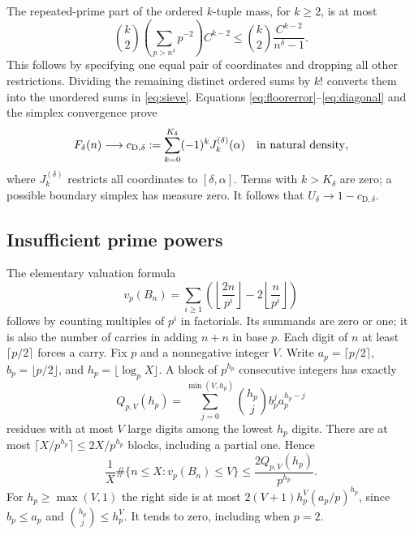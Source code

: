 \documentclass[10pt]{article}
\theoremstyle{remark}
\begin{document}
The repeated-prime part of the ordered $k$-tuple mass, for $k\geq2$,
is at most
\begin{equation}\label{eq:diagonal}
 \binom{k}{2}\left(\sum_{p>n^\delta}p^{-2}\right)C^{k-2}
 \leq\binom{k}{2}\frac{C^{k-2}}{n^\delta-1}.
\end{equation}
This follows by specifying one equal pair of coordinates and dropping
all other restrictions. Dividing the remaining distinct ordered sums
by $k!$ converts them into the unordered sums in \eqref{eq:sieve}.
Equations \eqref{eq:floorerror}--\eqref{eq:diagonal} and the simplex
convergence prove
\begin{equation}\label{eq:Fdelta}
 F_\delta(n)\longrightarrow
 c_{\mathrm D,\delta}:=\sum_{k=0}^{K_\delta}(-1)^kJ_k^{(\delta)}(\alpha)
 \quad\hbox{in natural density},
\end{equation}
where $J_k^{(\delta)}$ restricts all coordinates to $[\delta,\alpha]$.
Terms with $k>K_\delta$ are zero; a possible boundary simplex has
measure zero. It follows that $U_\delta\to1-c_{\mathrm D,\delta}$.

\subsection{Insufficient prime powers}\label{subsec:T}
The elementary valuation formula
\begin{equation}\label{eq:valuation}
 v_p(B_n)=\sum_{i\geq1}
 \left(\left\lfloor\frac{2n}{p^i}\right\rfloor
             -2\left\lfloor\frac n{p^i}\right\rfloor\right)
\end{equation}
follows by counting multiples of $p^i$ in factorials. Its summands
are zero or one; it is also the number of carries in adding $n+n$ in
base $p$. Each digit of $n$ at least $\lceil p/2\rceil$ forces a carry.
Fix $p$ and a nonnegative integer $V$. Write
$a_p=\lceil p/2\rceil$, $b_p=\lfloor p/2\rfloor$, and
$h_p=\lfloor\log_pX\rfloor$. A block of $p^{h_p}$ consecutive
integers has exactly
\[
 Q_{p,V}(h_p)=\sum_{j=0}^{\min(V,h_p)}
        \binom{h_p}{j}b_p^j a_p^{h_p-j}
\]
residues with at most $V$ large digits among the lowest $h_p$ digits.
There are at most $\lceil X/p^{h_p}\rceil\leq2X/p^{h_p}$ blocks,
including a partial one. Hence
\begin{equation}\label{eq:fixedp}
 \frac1X\#\{n\leq X:v_p(B_n)\leq V\}
 \leq\frac{2Q_{p,V}(h_p)}{p^{h_p}}.
\end{equation}
For $h_p\geq\max(V,1)$ the right side is at most
$2(V+1)h_p^V(a_p/p)^{h_p}$, since $b_p\leq a_p$ and
$\binom{h_p}{j}\leq h_p^V$. It tends to zero, including when $p=2$.
\end{document}

